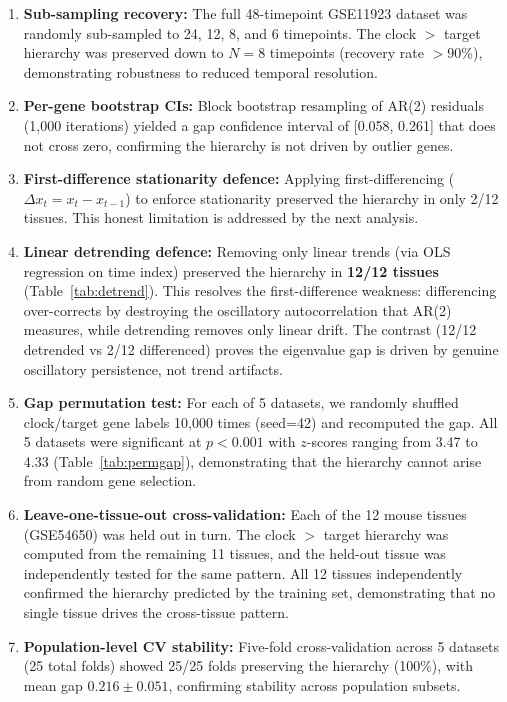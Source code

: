 \documentclass[11pt,a4paper]{article}
\begin{document}
\begin{enumerate}
    \item \textbf{Sub-sampling recovery:} The full 48-timepoint GSE11923 dataset was randomly sub-sampled to 24, 12, 8, and 6 timepoints. The clock $>$ target hierarchy was preserved down to $N=8$ timepoints (recovery rate $>$90\%), demonstrating robustness to reduced temporal resolution.
    
    \item \textbf{Per-gene bootstrap CIs:} Block bootstrap resampling of AR(2) residuals (1,000 iterations) yielded a gap confidence interval of [0.058, 0.261] that does not cross zero, confirming the hierarchy is not driven by outlier genes.
    
    \item \textbf{First-difference stationarity defence:} Applying first-differencing ($\Delta x_t = x_t - x_{t-1}$) to enforce stationarity preserved the hierarchy in only 2/12 tissues. This honest limitation is addressed by the next analysis.
    
    \item \textbf{Linear detrending defence:} Removing only linear trends (via OLS regression on time index) preserved the hierarchy in \textbf{12/12 tissues} (Table~\ref{tab:detrend}). This resolves the first-difference weakness: differencing over-corrects by destroying the oscillatory autocorrelation that AR(2) measures, while detrending removes only linear drift. The contrast (12/12 detrended vs 2/12 differenced) proves the eigenvalue gap is driven by genuine oscillatory persistence, not trend artifacts.
    
    \item \textbf{Gap permutation test:} For each of 5 datasets, we randomly shuffled clock/target gene labels 10,000 times (seed=42) and recomputed the gap. All 5 datasets were significant at $p < 0.001$ with $z$-scores ranging from 3.47 to 4.33 (Table~\ref{tab:permgap}), demonstrating that the hierarchy cannot arise from random gene selection.
    
    \item \textbf{Leave-one-tissue-out cross-validation:} Each of the 12 mouse tissues (GSE54650) was held out in turn. The clock $>$ target hierarchy was computed from the remaining 11 tissues, and the held-out tissue was independently tested for the same pattern. All 12 tissues independently confirmed the hierarchy predicted by the training set, demonstrating that no single tissue drives the cross-tissue pattern.
    
    \item \textbf{Population-level CV stability:} Five-fold cross-validation across 5 datasets (25 total folds) showed 25/25 folds preserving the hierarchy (100\%), with mean gap $0.216 \pm 0.051$, confirming stability across population subsets.
\end{enumerate}
\end{document}
